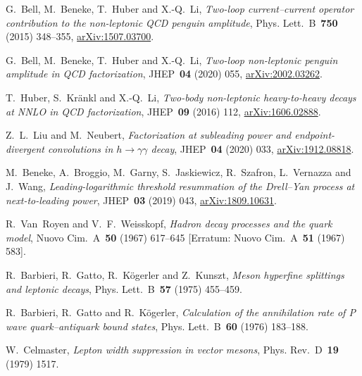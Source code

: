 G.~Bell, M.~Beneke, T.~Huber and X.-Q.~Li, \emph{Two-loop current--current operator contribution to the non-leptonic QCD penguin amplitude}, Phys. Lett.~B~\textbf{750} (2015) \mbox{348--355}, \href{https://arxiv.org/abs/1507.03700}{arXiv:1507.03700}.

G.~Bell, M.~Beneke, T.~Huber and X.-Q.~Li, \emph{Two-loop non-leptonic penguin amplitude in QCD factorization}, JHEP~\textbf{04} (2020) \mbox{055}, \href{https://arxiv.org/abs/2002.03262}{arXiv:2002.03262}.

T.~Huber, S.~Kr\"ankl and X.-Q.~Li, \emph{Two-body non-leptonic heavy-to-heavy decays at NNLO in QCD factorization}, JHEP~\textbf{09} (2016) \mbox{112}, \href{https://arxiv.org/abs/1606.02888}{arXiv:1606.02888}.

Z.~L.~Liu and M.~Neubert, \emph{Factorization at subleading power and endpoint-divergent convolutions in $h\to\gamma\gamma$ decay}, JHEP~\textbf{04} (2020) \mbox{033}, \href{https://arxiv.org/abs/1912.08818}{arXiv:1912.08818}.

M.~Beneke, A.~Broggio, M.~Garny, S.~Jaskiewicz, R.~Szafron, L.~Vernazza and J.~Wang, \emph{Leading-logarithmic threshold resummation of the Drell--Yan process at next-to-leading power}, JHEP~\textbf{03} (2019) \mbox{043}, \href{https://arxiv.org/abs/1809.10631}{arXiv:1809.10631}.

R.~Van~Royen and V.~F.~Weisskopf, \emph{Hadron decay processes and the quark model}, Nuovo Cim.~A~\textbf{50} (1967) \mbox{617--645} [Erratum: Nuovo Cim.~A~\textbf{51} (1967) \mbox{583}].

R.~Barbieri, R.~Gatto, R.~K\"ogerler and Z.~Kunszt, \emph{Meson hyperfine splittings and leptonic decays}, Phys. Lett.~B~\textbf{57} (1975) \mbox{455--459}.

R.~Barbieri, R.~Gatto and R.~K\"ogerler, \emph{Calculation of the annihilation rate of P wave quark--antiquark bound states}, Phys. Lett.~B~\textbf{60} (1976) \mbox{183--188}.

W.~Celmaster, \emph{Lepton width suppression in vector mesons}, Phys. Rev.~D~\textbf{19} (1979) \mbox{1517}.


